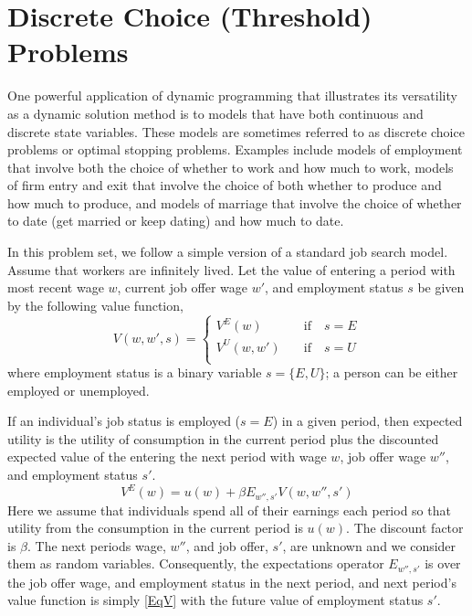 
\section*{Discrete Choice (Threshold) Problems}\label{SecDiscrChoice}

One powerful application of dynamic programming that illustrates its versatility as a dynamic solution method is to models that have both continuous and discrete state variables. These models are sometimes referred to as discrete choice problems or optimal stopping problems.  Examples include models of employment that involve both the choice of whether to work and how much to work, models of firm entry and exit that involve the choice of both whether to produce and how much to produce, and models of marriage that involve the choice of whether to date (get married or keep dating) and how much to date.

In this problem set, we follow a simple version of a standard job search model.  Assume that workers are infinitely lived. Let the value of entering a period with most recent wage $w$, current job offer wage $w'$, and employment status $s$ be given by the following value function,
\begin{equation}\label{EqV}
   V(w,w',s) = \begin{cases}
                  V^E(w)    \quad&\text{if}\quad s = E \\
                  V^U(w,w') \quad&\text{if}\quad s = U \\
               \end{cases}
\end{equation}
where employment status is a binary variable $s=\{E,U\}$; a person can be either employed or unemployed.

If an individual's job status is employed ($s = E$) in a given period, then expected utility is the utility of consumption in the current period plus the discounted expected value of the entering the next period with wage $w$, job offer wage $w''$, and employment status $s'$.
\begin{equation}\label{EqVe1}
   V^E(w) = u(w) + \beta E_{w'',s'}V(w,w'',s')
\end{equation}
Here we assume that individuals spend all of their earnings each period so that utility from the consumption in the current period is $u(w)$.  The discount factor is $\beta$.  The next periods wage, $w''$, and job offer, $s'$, are unknown and we consider them as random variables.  Consequently, the expectations operator $E_{w'',s'}$ is over the job offer wage, and employment status in the next period, and next period's value function is simply \eqref{EqV} with the future value of employment status $s'$.

